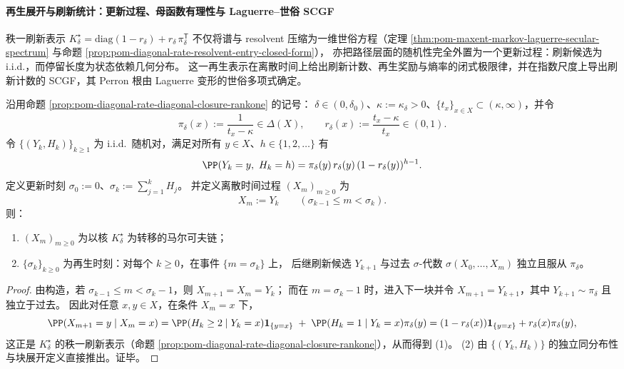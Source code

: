 \paragraph{再生展开与刷新统计：更新过程、母函数有理性与 Laguerre--世俗 SCGF}
秩一刷新表示
\(
K^\star_\delta=\mathrm{diag}(1-r_\delta)+r_\delta\,\pi_\delta^{\mathsf T}
\)
不仅将谱与 resolvent 压缩为一维世俗方程（定理 \ref{thm:pom-maxent-markov-laguerre-secular-spectrum} 与命题 \ref{prop:pom-diagonal-rate-resolvent-entry-closed-form}），
亦把路径层面的随机性完全外置为一个更新过程：刷新候选为 i.i.d.，而停留长度为状态依赖几何分布。
这一再生表示在离散时间上给出刷新计数、再生奖励与熵率的闭式极限律，并在指数尺度上导出刷新计数的 SCGF，其 Perron 根由 Laguerre 变形的世俗多项式确定。

\begin{theorem}[秩一刷新核的再生展开表示]\label{thm:pom-diagonal-rate-refresh-regeneration-iid-expansion}
沿用命题 \ref{prop:pom-diagonal-rate-diagonal-closure-rankone} 的记号：
\(\delta\in(0,\delta_0)\)、\(\kappa:=\kappa_\delta>0\)、\(\{t_x\}_{x\in X}\subset(\kappa,\infty)\)，并令
\[
\pi_\delta(x):=\frac{1}{t_x-\kappa}\in\Delta(X),
\qquad
r_\delta(x):=\frac{t_x-\kappa}{t_x}\in(0,1).
\]
令 \(\{(Y_k,H_k)\}_{k\ge 1}\) 为 i.i.d.\ 随机对，满足对所有 \(y\in X\)、\(h\in\{1,2,\dots\}\) 有
\[
\PP(Y_k=y,\ H_k=h)=\pi_\delta(y)\,r_\delta(y)\,(1-r_\delta(y))^{h-1}.
\]
定义更新时刻 \(\sigma_0:=0\)、\(\sigma_k:=\sum_{j=1}^{k}H_j\)。
并定义离散时间过程 \((X_m)_{m\ge 0}\) 为
\[
X_m:=Y_k\qquad(\sigma_{k-1}\le m<\sigma_k).
\]
则：
\begin{enumerate}
  \item \((X_m)_{m\ge 0}\) 为以核 \(K^\star_\delta\) 为转移的马尔可夫链；
  \item \(\{\sigma_k\}_{k\ge 0}\) 为再生时刻：对每个 \(k\ge 0\)，在事件 \(\{m=\sigma_k\}\) 上，
  后继刷新候选 \(Y_{k+1}\) 与过去 \(\sigma\)-代数 \(\sigma(X_0,\dots,X_m)\) 独立且服从 \(\pi_\delta\)。
\end{enumerate}
\end{theorem}
\begin{proof}
由构造，若 \(\sigma_{k-1}\le m<\sigma_k-1\)，则 \(X_{m+1}=X_m=Y_k\)；
而在 \(m=\sigma_k-1\) 时，进入下一块并令 \(X_{m+1}=Y_{k+1}\)，其中 \(Y_{k+1}\sim\pi_\delta\) 且独立于过去。
因此对任意 \(x,y\in X\)，在条件 \(X_m=x\) 下，
\[
\PP(X_{m+1}=y\mid X_m=x)
=\PP(H_k\ge 2\mid Y_k=x)\mathbf 1_{\{y=x\}}
\;+\;\PP(H_k=1\mid Y_k=x)\pi_\delta(y)
=(1-r_\delta(x))\mathbf 1_{\{y=x\}}+r_\delta(x)\pi_\delta(y),
\]
这正是 \(K^\star_\delta\) 的秩一刷新表示（命题 \ref{prop:pom-diagonal-rate-diagonal-closure-rankone}），从而得到 (1)。
(2) 由 \(\{(Y_k,H_k)\}\) 的独立同分布性与块展开定义直接推出。证毕。
\end{proof}

